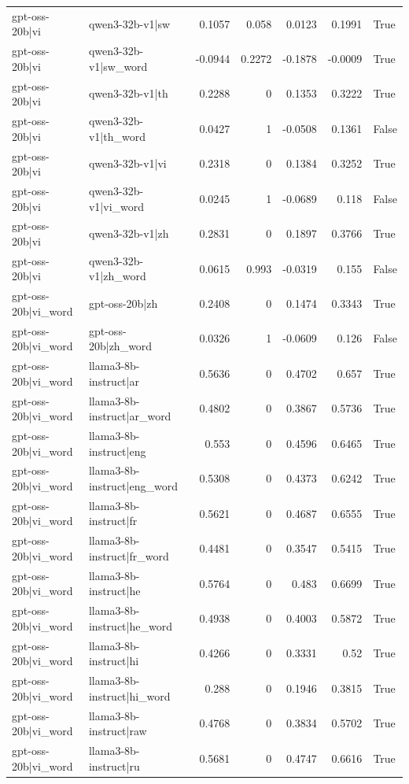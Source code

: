 \begin{table}
\begin{tabular}{l l r r r r l}
gpt-oss-20b|vi & qwen3-32b-v1|sw & 0.1057 & 0.058 & 0.0123 & 0.1991 & True \\
gpt-oss-20b|vi & qwen3-32b-v1|sw_word & -0.0944 & 0.2272 & -0.1878 & -0.0009 & True \\
gpt-oss-20b|vi & qwen3-32b-v1|th & 0.2288 & 0 & 0.1353 & 0.3222 & True \\
gpt-oss-20b|vi & qwen3-32b-v1|th_word & 0.0427 & 1 & -0.0508 & 0.1361 & False \\
gpt-oss-20b|vi & qwen3-32b-v1|vi & 0.2318 & 0 & 0.1384 & 0.3252 & True \\
gpt-oss-20b|vi & qwen3-32b-v1|vi_word & 0.0245 & 1 & -0.0689 & 0.118 & False \\
gpt-oss-20b|vi & qwen3-32b-v1|zh & 0.2831 & 0 & 0.1897 & 0.3766 & True \\
gpt-oss-20b|vi & qwen3-32b-v1|zh_word & 0.0615 & 0.993 & -0.0319 & 0.155 & False \\
gpt-oss-20b|vi_word & gpt-oss-20b|zh & 0.2408 & 0 & 0.1474 & 0.3343 & True \\
gpt-oss-20b|vi_word & gpt-oss-20b|zh_word & 0.0326 & 1 & -0.0609 & 0.126 & False \\
gpt-oss-20b|vi_word & llama3-8b-instruct|ar & 0.5636 & 0 & 0.4702 & 0.657 & True \\
gpt-oss-20b|vi_word & llama3-8b-instruct|ar_word & 0.4802 & 0 & 0.3867 & 0.5736 & True \\
gpt-oss-20b|vi_word & llama3-8b-instruct|eng & 0.553 & 0 & 0.4596 & 0.6465 & True \\
gpt-oss-20b|vi_word & llama3-8b-instruct|eng_word & 0.5308 & 0 & 0.4373 & 0.6242 & True \\
gpt-oss-20b|vi_word & llama3-8b-instruct|fr & 0.5621 & 0 & 0.4687 & 0.6555 & True \\
gpt-oss-20b|vi_word & llama3-8b-instruct|fr_word & 0.4481 & 0 & 0.3547 & 0.5415 & True \\
gpt-oss-20b|vi_word & llama3-8b-instruct|he & 0.5764 & 0 & 0.483 & 0.6699 & True \\
gpt-oss-20b|vi_word & llama3-8b-instruct|he_word & 0.4938 & 0 & 0.4003 & 0.5872 & True \\
gpt-oss-20b|vi_word & llama3-8b-instruct|hi & 0.4266 & 0 & 0.3331 & 0.52 & True \\
gpt-oss-20b|vi_word & llama3-8b-instruct|hi_word & 0.288 & 0 & 0.1946 & 0.3815 & True \\
gpt-oss-20b|vi_word & llama3-8b-instruct|raw & 0.4768 & 0 & 0.3834 & 0.5702 & True \\
gpt-oss-20b|vi_word & llama3-8b-instruct|ru & 0.5681 & 0 & 0.4747 & 0.6616 & True \\

\end{tabular}
\end{table}
